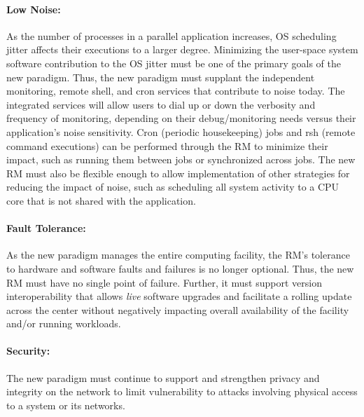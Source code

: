 \documentclass[10pt]{article}
\newcommand{\ngrm}{NGRM}
\begin{document}
\paragraph{Low Noise:}
As the number of processes in a parallel application increases, 
OS scheduling jitter affects their executions to a larger degree.
Minimizing
the user-space system software contribution to the OS jitter must be one 
of the primary goals of the new paradigm.  Thus, the new paradigm must supplant
the independent monitoring, remote shell, and cron
services that contribute to noise today. The integrated services will
allow users to dial up or down the verbosity and frequency of monitoring,
depending on their debug/monitoring needs versus their application's noise
sensitivity. Cron (periodic housekeeping) jobs and rsh (remote command
executions) can be performed through the RM to minimize their impact,
such as running them between jobs or synchronized across jobs. 
The new RM must also be flexible enough to allow implementation of other
strategies for reducing the impact of noise, such as scheduling all
system activity to a CPU core that is not shared with the application.


\paragraph{Fault Tolerance:}
As the new paradigm manages the entire computing facility,
the RM's tolerance to hardware and software faults and failures
is no longer optional.
Thus, the new RM must have no single point of failure. Further, it must support
version interoperability that allows {\em live} software upgrades
and facilitate a rolling update across the center
without negatively impacting overall availability of 
the facility and/or running workloads.


\paragraph{Security:}
The new paradigm must continue to support and strengthen privacy 
and integrity on
the network to limit vulnerability to attacks involving physical access
to a system or its networks.

%
\end{document}
